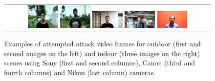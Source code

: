 \documentclass[journal]{IEEEtran}
\providecommand{\rv}[1]{{\protect\color{black}{#1}}}
\providecommand{\rrv}[1]{{\protect\color{black}{#1}}}
\begin{document}
%
\begin{figure}[!htb]
\centering

\begin{tabular}{c}
	\includegraphics*[width=0.15\textwidth]{figure-08a.png}
	\includegraphics*[width=0.15\textwidth]{figure-08b.png}
	\includegraphics*[width=0.15\textwidth, height=0.105\textheight]{figure-08c.png}
	\includegraphics*[width=0.15\textwidth, height=0.105\textheight]{figure-08d.png}
	\includegraphics*[width=0.15\textwidth, height=0.105\textheight]{figure-08e.png}

\end{tabular}
\caption{Examples of attempted attack video frames for outdoor (first and second images on the left) and indoor (three images on the right) scenes using Sony (first and second columns), Canon (third and fourth columns) and Nikon (last column) cameras.}
\label{fig:exemplosVideosAtaque}
\end{figure}

\end{document}
